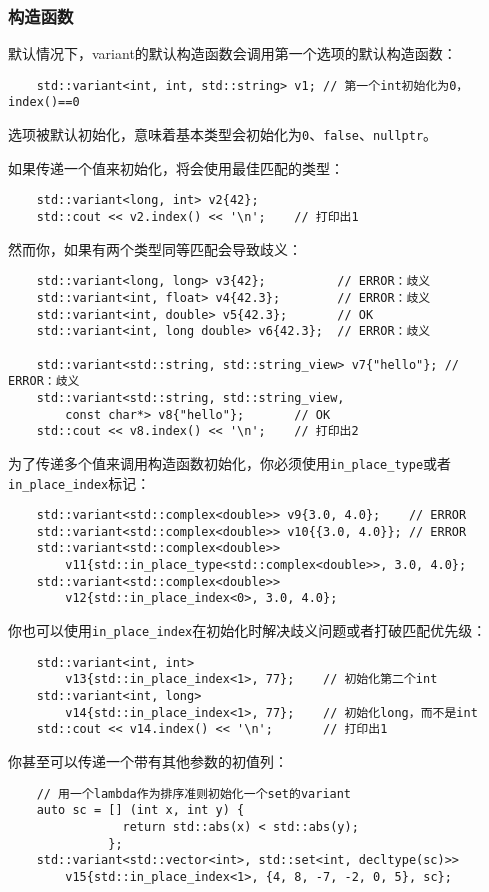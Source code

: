 \subsubsection*{构造函数}
默认情况下，variant的默认构造函数会调用第一个选项的默认构造函数：
\begin{lstlisting}
    std::variant<int, int, std::string> v1; // 第一个int初始化为0，index()==0
\end{lstlisting}
选项被默认初始化，意味着基本类型会初始化为\texttt{0}、\texttt{false}、\texttt{nullptr}。

如果传递一个值来初始化，将会使用最佳匹配的类型：
\begin{lstlisting}
    std::variant<long, int> v2{42};
    std::cout << v2.index() << '\n';    // 打印出1
\end{lstlisting}
然而你，如果有两个类型同等匹配会导致歧义：
\begin{lstlisting}
    std::variant<long, long> v3{42};          // ERROR：歧义
    std::variant<int, float> v4{42.3};        // ERROR：歧义
    std::variant<int, double> v5{42.3};       // OK
    std::variant<int, long double> v6{42.3};  // ERROR：歧义

    std::variant<std::string, std::string_view> v7{"hello"}; // ERROR：歧义
    std::variant<std::string, std::string_view,
        const char*> v8{"hello"};       // OK
    std::cout << v8.index() << '\n';    // 打印出2
\end{lstlisting}
为了传递多个值来调用构造函数初始化，你必须使用\texttt{in\_place\_type}或者
\texttt{in\_place\_index}标记：
\begin{lstlisting}
    std::variant<std::complex<double>> v9{3.0, 4.0};    // ERROR
    std::variant<std::complex<double>> v10{{3.0, 4.0}}; // ERROR
    std::variant<std::complex<double>>
        v11{std::in_place_type<std::complex<double>>, 3.0, 4.0};
    std::variant<std::complex<double>>
        v12{std::in_place_index<0>, 3.0, 4.0};
\end{lstlisting}
你也可以使用\texttt{in\_place\_index}在初始化时解决歧义问题或者打破匹配优先级：
\begin{lstlisting}
    std::variant<int, int>
        v13{std::in_place_index<1>, 77};    // 初始化第二个int
    std::variant<int, long>
        v14{std::in_place_index<1>, 77};    // 初始化long，而不是int
    std::cout << v14.index() << '\n';       // 打印出1
\end{lstlisting}
你甚至可以传递一个带有其他参数的初值列：
\begin{lstlisting}
    // 用一个lambda作为排序准则初始化一个set的variant
    auto sc = [] (int x, int y) {
                return std::abs(x) < std::abs(y);
              };
    std::variant<std::vector<int>, std::set<int, decltype(sc)>>
        v15{std::in_place_index<1>, {4, 8, -7, -2, 0, 5}, sc};
\end{lstlisting}
